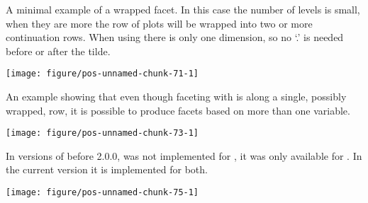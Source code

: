 \documentclass[paper=a4,10pt,div=17,headsepline,BCOR=12mm,twoside,open=right]{scrbook}\usepackage{knitr}
\begin{document}
A minimal example of a wrapped facet. In this case the number of levels is
small, when they are more the row of plots will be wrapped into two or more
continuation rows. When using  there is only one dimension, so no `.'
 is needed before or after the tilde.

\begin{knitrout}\footnotesize
{}\color{fgcolor}\begin{kframe}
\begin{alltt}
 \hlopt{+} \hlstd{(}\hlopt{~} 
\end{alltt}
\end{kframe}

{\centering \texttt{[image: figure/pos-unnamed-chunk-71-1]} 

}



\end{knitrout}

An example showing that even though faceting with  is along a single, possibly wrapped, row, it is possible to produce facets based on more than one variable.



\begin{knitrout}\footnotesize
{}\color{fgcolor}\begin{kframe}
\begin{alltt}
 \hlopt{+} \hlstd{(}\hlopt{~}  \hlopt{+}  \hlstd{=}\hlstd{)}
\end{alltt}
\end{kframe}

{\centering \texttt{[image: figure/pos-unnamed-chunk-73-1]} 

}



\end{knitrout}

In versions of \ggplot before 2.0.0,  was not implemented for
, it was only available for . In the current
version it is implemented for both.



\begin{knitrout}\footnotesize
{}\color{fgcolor}\begin{kframe}
\begin{alltt}
 \hlopt{+} \hlstd{(}\hlopt{~}   \hlstd{=}  \hlopt{^} 
\end{alltt}
\end{kframe}

{\centering \texttt{[image: figure/pos-unnamed-chunk-75-1]} 

}



\end{knitrout}
\end{document}
